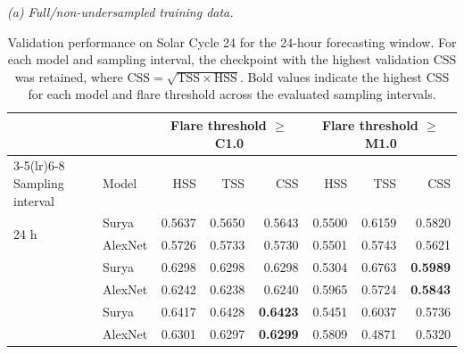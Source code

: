 
\begin{table}[t]
\centering
\caption{Validation performance on Solar Cycle 24 for the 24-hour forecasting window. For each model and sampling interval, the checkpoint with the highest validation CSS was retained, where $\mathrm{CSS}=\sqrt{\mathrm{TSS}\times\mathrm{HSS}}$. Bold values indicate the highest CSS for each model and flare threshold across the evaluated sampling intervals.}
\label{tab:validation-24h}
\small
\textit{(a) Full/non-undersampled training data.}\\[2pt]
\begin{tabular}{llrrr rrr}
\toprule
& & \multicolumn{3}{c}{Flare threshold $\geq$ C1.0} & \multicolumn{3}{c}{Flare threshold $\geq$ M1.0} \\
\cmidrule(lr){3-5}\cmidrule(lr){6-8}
Sampling interval & Model & HSS & TSS & CSS & HSS & TSS & CSS \\
\midrule
\multirow{2}{*}{24 h}
  & Surya & 0.5637 & 0.5650 & 0.5643 & 0.5500 & 0.6159 & 0.5820 \\
  & AlexNet & 0.5726 & 0.5733 & 0.5730 & 0.5501 & 0.5743 & 0.5621 \\
\addlinespace
\multirow{2}{*}{12 h}
  & Surya & 0.6298 & 0.6298 & 0.6298 & 0.5304 & 0.6763 & \textbf{0.5989} \\
  & AlexNet & 0.6242 & 0.6238 & 0.6240 & 0.5965 & 0.5724 & \textbf{0.5843} \\
\addlinespace
\multirow{2}{*}{8 h}
  & Surya & 0.6417 & 0.6428 & \textbf{0.6423} & 0.5451 & 0.6037 & 0.5736 \\
  & AlexNet & 0.6301 & 0.6297 & \textbf{0.6299} & 0.5809 & 0.4871 & 0.5320 \\
\bottomrule
\end{tabular}


\end{table}
